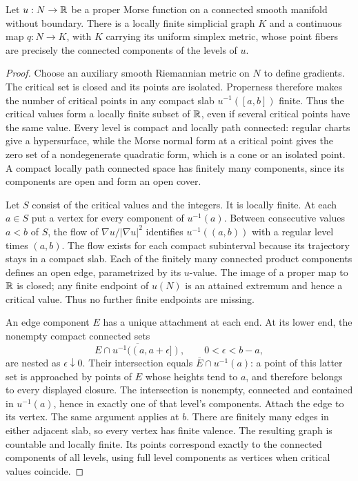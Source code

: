 \begin{lemma}
\label{cover:reeb}
Let $u:N\to\mathbb R$ be a proper Morse function on a connected smooth
manifold without boundary.  There is a locally finite simplicial graph $K$ and a
continuous map $q:N\to K$, with $K$ carrying its uniform simplex
metric, whose point fibers are precisely the connected components
of the levels of $u$.
\end{lemma}
\begin{proof}
Choose an auxiliary smooth Riemannian metric on $N$ to define gradients.
The critical set is closed and its points are isolated.  Properness
therefore makes the number of critical points in any compact slab
$u^{-1}([a,b])$ finite.  Thus the critical values form a locally finite
subset of $\mathbb R$, even if several critical points have the same value.
Every level is compact and locally path connected: regular charts
give a hypersurface, while the Morse normal form at a critical point
gives the zero set of a nondegenerate quadratic form, which is a cone
or an isolated point.  A compact locally path connected space has finitely
many components, since its components are open and form an open cover.

Let $S$ consist of the critical values and the integers.  It is
locally finite.  At each $a\in S$ put a vertex for every component
of $u^{-1}(a)$.  Between consecutive values $a<b$ of $S$, the flow of
$\nabla u/|\nabla u|^2$ identifies $u^{-1}((a,b))$ with a regular
level times $(a,b)$.  The flow exists for each compact subinterval
because its trajectory stays in a compact slab.  Each of the finitely
many connected product components defines an open edge, parametrized
by its $u$-value.  The image of a proper map to $\mathbb R$ is closed;
any finite endpoint of $u(N)$ is an attained extremum and hence a
critical value.  Thus no further finite endpoints are missing.

An edge component $E$ has a unique attachment at each end.  At its
lower end, the nonempty compact connected sets
\[
 \overline{E\cap u^{-1}((a,a+\epsilon])},
 \qquad 0<\epsilon<b-a,
\]
are nested as $\epsilon\downarrow0$.  Their intersection equals
$\overline E\cap u^{-1}(a)$: a point of this latter set is approached
by points of $E$ whose heights tend to $a$, and therefore belongs
to every displayed closure.  The intersection is nonempty,
connected and contained in $u^{-1}(a)$, hence in exactly one of that
level's components.  Attach the edge to its vertex.  The same argument
applies at $b$.  There are finitely many edges in either adjacent slab,
so every vertex has finite valence.  The resulting graph is countable
and locally finite.  Its points correspond exactly to the connected
components of all levels, using full level components as vertices
when critical values coincide.


\end{proof}
